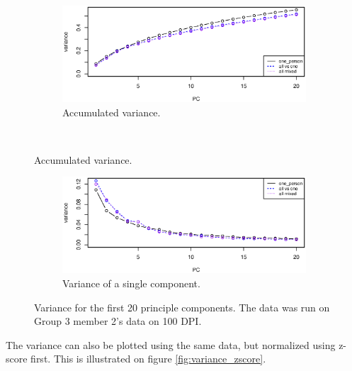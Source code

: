\begin{figure}[H]
\centering
\begin{subfigure}{0.70\textwidth}
\centering
\includegraphics[width=\textwidth]{graphics/pca_acc_variance}
\caption{Accumulated variance.}
\label{fig:pca_accumulated_var}
\end{subfigure}\\[-1cm]
\end{figure}
\begin{figure}
\centering
\ContinuedFloat
\begin{subfigure}{0.70\textwidth}
\centering
\includegraphics[width=\textwidth]{graphics/pca_variance}
\caption{Variance of a single component.}
\label{fig:pca_var}
\end{subfigure}
\caption[PCA variance.]{Variance for the first 20 principle components.
The data was run on Group 3 member 2's data on 100 DPI. }
\label{fig:variance}
\end{figure}


The variance can also be plotted using the same data, but normalized using z-score first.
This is illustrated on figure \ref{fig:variance_zscore}.




